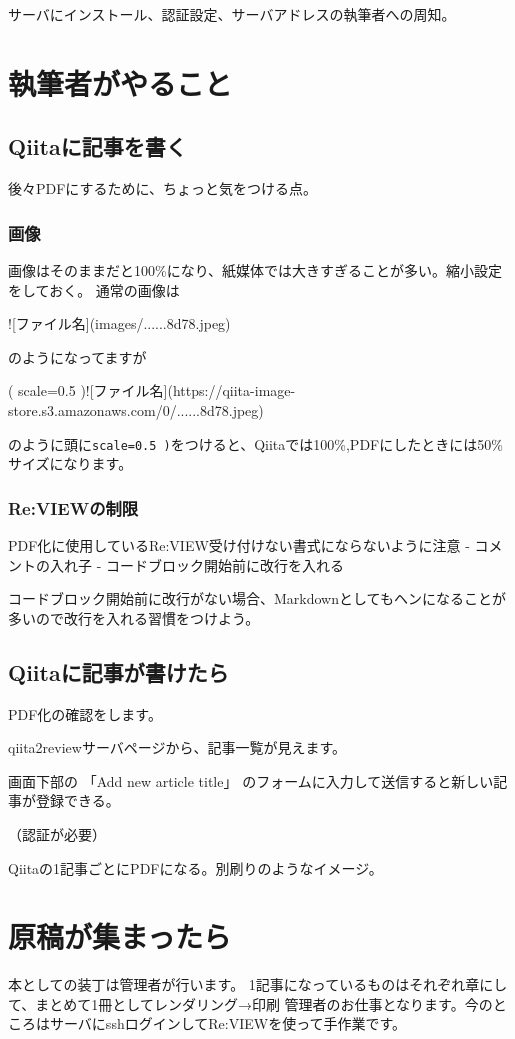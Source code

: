 サーバにインストール、認証設定、サーバアドレスの執筆者への周知。

\section{執筆者がやること}
\label{sec:1-3}

\subsection*{Qiitaに記事を書く}
\label{sec:1-3-1}

後々PDFにするために、ちょっと気をつける点。

\subsubsection*{画像}
\label{sec:1-3-1-1}

画像はそのままだと100\%になり、紙媒体では大きすぎることが多い。縮小設定をしておく。
通常の画像は

\begin{reviewemlist}
![ファイル名](images/......8d78.jpeg)
\end{reviewemlist}

のようになってますが

\begin{reviewemlist}
[]( scale=0.5 )![ファイル名](https://qiita{-}image{-}store.s3.amazonaws.com/0/......8d78.jpeg)

\end{reviewemlist}

のように頭に\texttt{scale=0.5 )}をつけると、Qiitaでは100\%,PDFにしたときには50\%サイズになります。

\subsubsection*{Re:VIEWの制限}
\label{sec:1-3-1-2}

PDF化に使用しているRe:VIEW受け付けない書式にならないように注意
{-} コメントの入れ子
{-} コードブロック開始前に改行を入れる

コードブロック開始前に改行がない場合、Markdownとしてもヘンになることが多いので改行を入れる習慣をつけよう。

\subsection*{Qiitaに記事が書けたら}
\label{sec:1-3-2}

PDF化の確認をします。

qiita2reviewサーバページから、記事一覧が見えます。

画面下部の
「Add new article title」
のフォームに入力して送信すると新しい記事が登録できる。

（認証が必要）

Qiitaの1記事ごとにPDFになる。別刷りのようなイメージ。

\section{原稿が集まったら}
\label{sec:1-4}

本としての装丁は管理者が行います。
1記事になっているものはそれぞれ章にして、まとめて1冊としてレンダリング→印刷
管理者のお仕事となります。今のところはサーバにsshログインしてRe:VIEWを使って手作業です。
